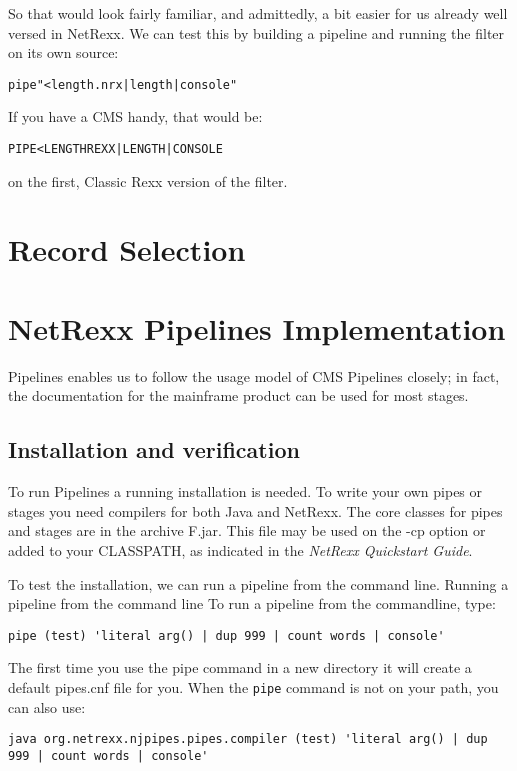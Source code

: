 So that would look fairly familiar, and admittedly, a bit easier for us already well versed in NetRexx.
We can test this by building a pipeline and running the filter on its
own source:
\begin{alltt}
pipe "<length.nrx | length | console"
 \end{alltt}
If you have a CMS handy, that would be:
\begin{alltt}
  PIPE < LENGTH REXX | LENGTH | CONSOLE
 \end{alltt}
on the first, Classic Rexx version of the filter.


\chapter{Record Selection}


\chapter{NetRexx Pipelines Implementation}
\nr{} Pipelines enables us to follow the usage model of CMS Pipelines
closely; in fact, the documentation for the mainframe product can be
used for most stages.

\section{Installation and verification}
To run \nr{} Pipelines a running \nr{} installation is needed.  To write your own pipes or stages you need compilers for both Java and NetRexx. 
The core classes for pipes and stages are in the archive \nr{}F.jar.  This file may
be used on the -cp option or added to your CLASSPATH, as indicated in
the \emph{NetRexx Quickstart Guide}.

To test the installation, we can run a pipeline from the command line.
Running a pipeline from the command line
 To run a pipeline from the commandline, type:
\begin{lstlisting}[label=countwords,caption=Count Words]
pipe (test) 'literal arg() | dup 999 | count words | console'
\end{lstlisting}

The first time you use the pipe command in a new directory it will
create a default pipes.cnf file for you. When the \texttt{pipe}
command is not on your path, you can also use:

\begin{lstlisting}[label=testdup,caption=Test Dup]
java org.netrexx.njpipes.pipes.compiler (test) 'literal arg() | dup 999 | count words | console'
\end{lstlisting}

